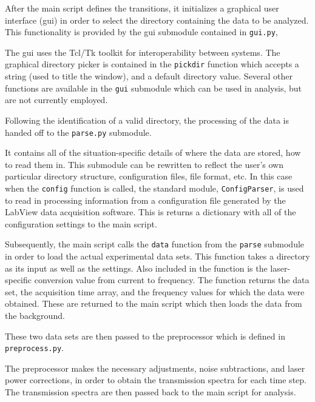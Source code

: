 After the main script defines the transitions, it initializes a graphical user
interface (\acs{gui}) in order to select the directory containing the data to be
analyzed. This functionality is provided by the \acs{gui} submodule contained in
\texttt{gui.py},
\begin{singlespace}
  
\end{singlespace}
The \acs{gui} uses the Tcl/Tk toolkit for interoperability between systems. The
graphical directory picker is contained in the \texttt{pickdir} function which
accepts a string (used to title the window), and a default directory value.
Several other functions are available in the \texttt{gui} submodule which can be
used in analysis, but are not currently employed.

Following the identification of a valid directory, the processing of the data is
handed off to the \texttt{parse.py} submodule.
\begin{singlespace}
  
\end{singlespace}
It contains all of the situation-specific details of where the data are stored,
how to read them in. This submodule can be rewritten to reflect the user's own
particular directory structure, configuration files, file format, etc. In this
case when the \texttt{config} function is called, the standard module,
\texttt{ConfigParser}, is used to read in processing information from a
configuration file generated by the LabView data acquisition software. This is
returns a dictionary with all of the configuration settings to the main script.

Subsequently, the main script calls the \texttt{data} function from the
\texttt{parse} submodule in order to load the actual experimental data sets.
This function takes a directory as its input as well as the settings. Also
included in the function is the laser-specific conversion value from current to
frequency. The function returns the data set, the acquisition time array, and
the frequency values for which the data were obtained. These are returned to the
main script which then loads the data from the background.

These two data sets are then passed to the preprocessor which is defined in
\texttt{preprocess.py}.
\begin{singlespace}
  
\end{singlespace}
The preprocessor makes the necessary adjustments, noise subtractions, and laser
power corrections, in order to obtain the transmission spectra for each time
step. The transmission spectra are then passed back to the main script for
analysis.

